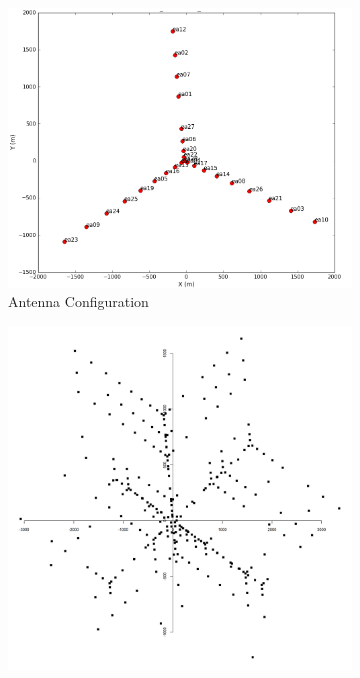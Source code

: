 \begin{figure}[h!]
	\centering
	\begin{subfigure}[b]{0.28\linewidth}
		\includegraphics[width=\linewidth, trim={18px 19px 18px 18px}, clip]{./chapters/01.intro/img/antennas.png}
		\caption{Antenna Configuration}
	\end{subfigure}
	\begin{subfigure}[b]{0.28\linewidth}
		\includegraphics[width=\linewidth, trim={18px 19px 18px 18px}, clip]{./chapters/01.intro/img/uv.png}

\end{subfigure}
\end{figure}
